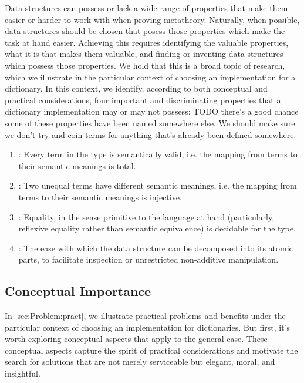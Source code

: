Data structures can possess or lack a wide range of properties that make them easier or harder to work with
when proving metatheory. Naturally, when possible, data structures should be chosen that posess those
properties which make the task at hand easier. Achieving this requires identifying the valuable properties,
what it is that makes them valuable, and finding or inventing data structures which possess those properties.
We hold that this is a broad topic of
research, which we illustrate in the particular context of choosing an implementation for a dictionary. In
this context, we identify, according to both conceptual and practical considerations, four important and
discriminating properties that a dictionary implementation may or may not possess:
TODO there's a good chance some of these properties have been named somewhere else. We should make sure we
don't try and coin terms for anything that's already been defined somewhere.
\begin{enumerate}
  \item \SemTot: Every term in the type is semantically valid, i.e. the mapping from
                 terms to their semantic meanings is total.
  \item \SemInj: Two unequal terms have different semantic meanings, i.e. the mapping
                 from terms to their semantic meanings is injective.
  \item \EqDec: Equality, in the sense primitive to the language at hand (particularly,
                reflexive equality rather than semantic equivalence) is decidable for the type.
  \item \EzDstr: The ease with which the data structure can be decomposed into its atomic
                 parts, to facilitate inspection or unrestricted non-additive manipulation.
\end{enumerate}


\subsection{Conceptual Importance}
\label{sec:Problem:concept}

In \autoref{sec:Problem:pract}, we illustrate practical problems and benefits under the particular context
of choosing an implementation for dictionaries. But first, it's worth exploring conceptual aspects that
apply to the general case. These conceptual aspects capture the spirit of practical considerations and
motivate the search for solutions that are not merely serviceable but elegant, moral, and insightful.

